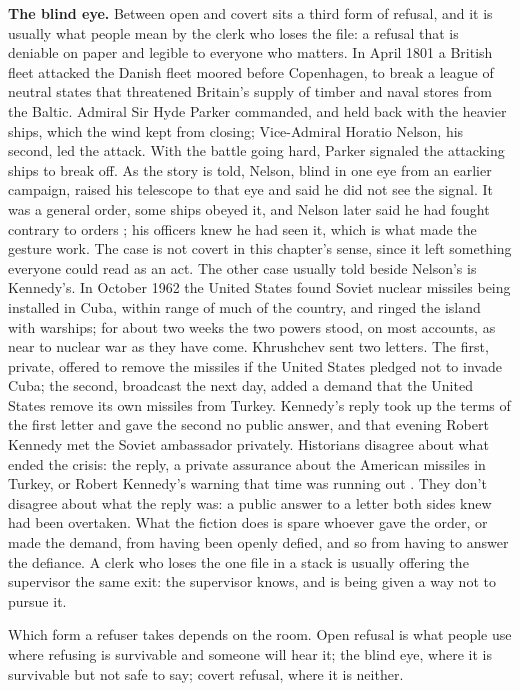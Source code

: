 \textbf{The blind eye.} Between open and covert sits a third form of refusal, and it is usually what people mean by the clerk who loses the file: a refusal that is deniable on paper and legible to everyone who matters. In April 1801 a British fleet attacked the Danish fleet moored before Copenhagen, to break a league of neutral states that threatened Britain's supply of timber and naval stores from the Baltic. Admiral Sir Hyde Parker commanded, and held back with the heavier ships, which the wind kept from closing; Vice-Admiral Horatio Nelson, his second, led the attack. With the battle going hard, Parker signaled the attacking ships to break off. As the story is told, Nelson, blind in one eye from an earlier campaign, raised his telescope to that eye and said he did not see the signal. It was a general order, some ships obeyed it, and Nelson later said he had fought contrary to orders \autocite{pope1972gamble}; his officers knew he had seen it, which is what made the gesture work. The case is not covert in this chapter's sense, since it left something everyone could read as an act. The other case usually told beside Nelson's is Kennedy's. In October 1962 the United States found Soviet nuclear missiles being installed in Cuba, within range of much of the country, and ringed the island with warships; for about two weeks the two powers stood, on most accounts, as near to nuclear war as they have come. Khrushchev sent two letters. The first, private, offered to remove the missiles if the United States pledged not to invade Cuba; the second, broadcast the next day, added a demand that the United States remove its own missiles from Turkey. Kennedy's reply took up the terms of the first letter and gave the second no public answer, and that evening Robert Kennedy met the Soviet ambassador privately. Historians disagree about what ended the crisis: the reply, a private assurance about the American missiles in Turkey, or Robert Kennedy's warning that time was running out \autocites[ch.~9]{stern2012memory}{freedman2021countdown}. They don't disagree about what the reply was: a public answer to a letter both sides knew had been overtaken. What the fiction does is spare whoever gave the order, or made the demand, from having been openly defied, and so from having to answer the defiance. A clerk who loses the one file in a stack is usually offering the supervisor the same exit: the supervisor knows, and is being given a way not to pursue it.

Which form a refuser takes depends on the room. Open refusal is what people use where refusing is survivable and someone will hear it; the blind eye, where it is survivable but not safe to say; covert refusal, where it is neither.

